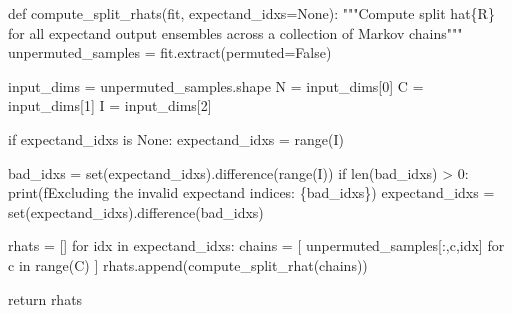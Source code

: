 \documentclass[
  letterpaper,
  DIV=11,
  numbers=noendperiod]{scrartcl}
\newenvironment{Shaded}{\begin{snugshade}}{\end{snugshade}}
\newcommand{\BuiltInTok}[1]{\textcolor[rgb]{0.00,0.23,0.31}{#1}}
\newcommand{\CommentTok}[1]{\textcolor[rgb]{0.37,0.37,0.37}{#1}}
\newcommand{\ControlFlowTok}[1]{\textcolor[rgb]{0.00,0.23,0.31}{#1}}
\newcommand{\DecValTok}[1]{\textcolor[rgb]{0.68,0.00,0.00}{#1}}
\newcommand{\KeywordTok}[1]{\textcolor[rgb]{0.00,0.23,0.31}{#1}}
\newcommand{\NormalTok}[1]{\textcolor[rgb]{0.00,0.23,0.31}{#1}}
\newcommand{\OperatorTok}[1]{\textcolor[rgb]{0.37,0.37,0.37}{#1}}
\newcommand{\SpecialCharTok}[1]{\textcolor[rgb]{0.37,0.37,0.37}{#1}}
\newcommand{\SpecialStringTok}[1]{\textcolor[rgb]{0.13,0.47,0.30}{#1}}
\newcommand{\VariableTok}[1]{\textcolor[rgb]{0.07,0.07,0.07}{#1}}
\begin{document}
\begin{Shaded}
\begin{Highlighting}[]
\KeywordTok{def}\NormalTok{ compute\_split\_rhats(fit, expectand\_idxs}\OperatorTok{=}\VariableTok{None}\NormalTok{):}
  \CommentTok{"""Compute split hat\{R\} for all expectand output ensembles across}
\CommentTok{     a collection of Markov chains"""}
\NormalTok{  unpermuted\_samples }\OperatorTok{=}\NormalTok{ fit.extract(permuted}\OperatorTok{=}\VariableTok{False}\NormalTok{)}
  
\NormalTok{  input\_dims }\OperatorTok{=}\NormalTok{ unpermuted\_samples.shape}
\NormalTok{  N }\OperatorTok{=}\NormalTok{ input\_dims[}\DecValTok{0}\NormalTok{]}
\NormalTok{  C }\OperatorTok{=}\NormalTok{ input\_dims[}\DecValTok{1}\NormalTok{]}
\NormalTok{  I }\OperatorTok{=}\NormalTok{ input\_dims[}\DecValTok{2}\NormalTok{]}
  
  \ControlFlowTok{if}\NormalTok{ expectand\_idxs }\KeywordTok{is} \VariableTok{None}\NormalTok{:}
\NormalTok{    expectand\_idxs }\OperatorTok{=} \BuiltInTok{range}\NormalTok{(I)}
  
\NormalTok{  bad\_idxs }\OperatorTok{=} \BuiltInTok{set}\NormalTok{(expectand\_idxs).difference(}\BuiltInTok{range}\NormalTok{(I))}
  \ControlFlowTok{if} \BuiltInTok{len}\NormalTok{(bad\_idxs) }\OperatorTok{\textgreater{}} \DecValTok{0}\NormalTok{:}
    \BuiltInTok{print}\NormalTok{(}\SpecialStringTok{f\textquotesingle{}Excluding the invalid expectand indices: }\SpecialCharTok{\{}\NormalTok{bad\_idxs}\SpecialCharTok{\}}\SpecialStringTok{\textquotesingle{}}\NormalTok{)}
\NormalTok{    expectand\_idxs }\OperatorTok{=} \BuiltInTok{set}\NormalTok{(expectand\_idxs).difference(bad\_idxs)}
    
\NormalTok{  rhats }\OperatorTok{=}\NormalTok{ []}
  \ControlFlowTok{for}\NormalTok{ idx }\KeywordTok{in}\NormalTok{ expectand\_idxs:}
\NormalTok{    chains }\OperatorTok{=}\NormalTok{ [ unpermuted\_samples[:,c,idx] }\ControlFlowTok{for}\NormalTok{ c }\KeywordTok{in} \BuiltInTok{range}\NormalTok{(C) ]}
\NormalTok{    rhats.append(compute\_split\_rhat(chains))}
  
  \ControlFlowTok{return}\NormalTok{ rhats}
\end{Highlighting}
\end{Shaded}
\end{document}
